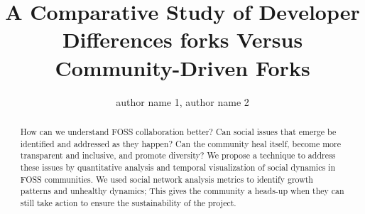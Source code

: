 \documentclass[ifip]{svmult}
\begin{document}
\title*{A Comparative Study of Developer Differences forks Versus Community-Driven Forks}

\author{author name 1, author name 2}
\institute{university name\\ 
 address, country\\
\texttt{\{author1,author2\}@department.university}\\
\texttt{http://department.university/\textasciitilde author1}\\
\texttt{http://department.university/\textasciitilde author2}}

%
%
\maketitle
\begin{abstract}
How can we understand FOSS collaboration better? Can social issues that emerge be identified and addressed as they happen? Can the community heal itself, become more transparent and inclusive, and promote diversity? We propose a technique to address these issues by quantitative analysis and temporal visualization of social dynamics in FOSS communities. We used social network analysis metrics to identify growth patterns and unhealthy dynamics; This gives the community a heads-up when they can still take action to ensure the sustainability of the project.\\
\end{abstract}
\end{document}
